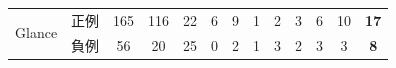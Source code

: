 \documentclass[T,J]{fose} %
\begin{document}
\begin{table}[]
{\begin{tabular}{l|l|c|c|c|cc|cc|cc|cc}
\multirow{2}{*}{Glance}                     & 正例                                         & 165                                       & 116                                         & 22                                           & 6         & 9          & 1         & 2          & 3         & 6          & 10         & {\textbf{17}}        \\
                                            & 負例                                         & 56                                        & 20                                          & 25                                           & 0         & 2          & 1         & 3          & 2         & 3          & 3          & {\textbf{8}}     \\ \hline   
\end{tabular}}

\vspace{4mm}


\end{table}
\end{document}
